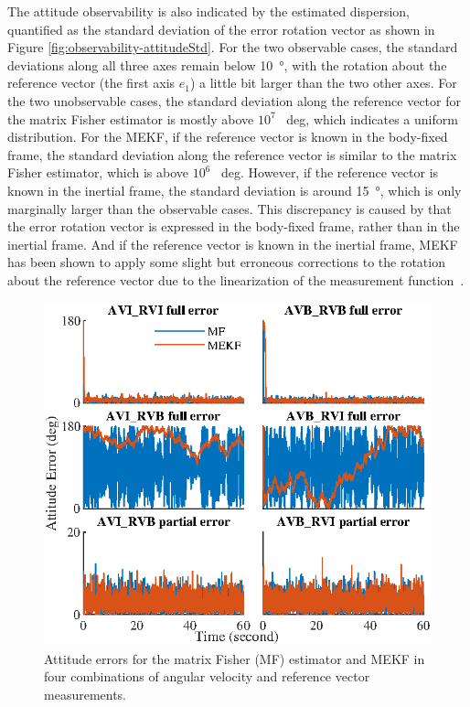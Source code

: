 The attitude observability is also indicated by the estimated dispersion, quantified as the standard deviation of the error rotation vector as shown in Figure \ref{fig:observability-attitudeStd}.
For the two observable cases, the standard deviations along all three axes remain below \SI{10}{\degree}, with the rotation about the reference vector (the first axis $e_1$) a little bit larger than the two other axes.
For the two unobservable cases, the standard deviation along the reference vector for the matrix Fisher estimator is mostly above $10^7$ \SI{}{deg}, which  indicates a uniform distribution.
For the MEKF, if the reference vector is known in the body-fixed frame, the standard deviation along the reference vector is similar to the matrix Fisher estimator, which is above $10^6$ \SI{}{deg}.
However, if the reference vector is known in the inertial frame, the standard deviation is around \SI{15}{\degree}, which is only marginally larger than the observable cases.
This discrepancy is caused by that the error rotation vector is expressed in the body-fixed frame, rather than in the inertial frame.
And if the reference vector is known in the inertial frame, MEKF has been shown to apply some slight but erroneous corrections to the rotation about the reference vector due to the linearization of the measurement function~\cite{li2012improving}.

\begin{figure}
	\centering
	\includegraphics[scale=1.4]{figures/observability/attitudeError}
	\caption{Attitude errors for the matrix Fisher (MF) estimator and MEKF in four combinations of angular velocity and reference vector measurements. \label{fig:observability-attitudeError}}
\end{figure}

